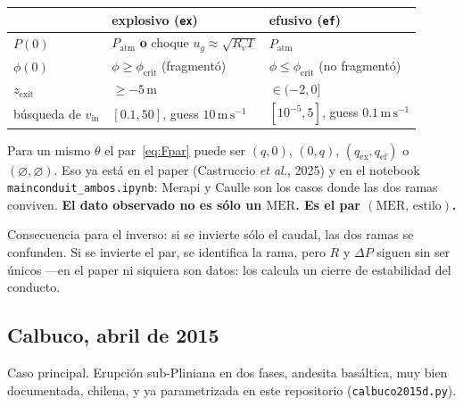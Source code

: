 \documentclass[11pt,a4paper]{article}
\theoremstyle{plain}
\theoremstyle{definition}
\theoremstyle{remark}
\newcommand{\MER}{\mathrm{MER}}
\newcommand{\Rv}{R_v}
\begin{document}
\begin{center}
\small
\begin{tabular}{@{}lll@{}}
\toprule
 & explosivo (\texttt{ex}) & efusivo (\texttt{ef}) \\
\midrule
$P(0)$ & $P_{\mathrm{atm}}$ \textbf{o} choque $u_g\approx\sqrt{\Rv T}$
  & $P_{\mathrm{atm}}$ \\
$\phi(0)$ & $\phi\ge\phi_{\mathrm{crit}}$ (fragmentó)
  & $\phi\le\phi_{\mathrm{crit}}$ (no fragmentó) \\
$z_{\mathrm{exit}}$ & $\ge -5\,\mathrm{m}$ & $\in(-2,0]$ \\
búsqueda de $v_{\mathrm{in}}$ & $[0.1,50]$, guess $10\,\mathrm{m\,s^{-1}}$
  & $[10^{-5},5]$, guess $0.1\,\mathrm{m\,s^{-1}}$ \\
\bottomrule
\end{tabular}
\end{center}

\vspace{0.3em}
Para un mismo $\theta$ el par~\eqref{eq:Fpar} puede ser
$(q,0)$, $(0,q)$, $(q_{\mathrm{ex}},q_{\mathrm{ef}})$ o
$(\varnothing,\varnothing)$. Eso ya está en el paper
(Castruccio \emph{et al.}, 2025) y en el notebook
\texttt{mainconduit\_ambos.ipynb}: Merapi y Caulle son los casos
donde las dos ramas conviven. \textbf{El dato observado no es
sólo un $\MER$. Es el par $(\MER,\,\mathrm{estilo})$.}

Consecuencia para el inverso: si se invierte sólo el caudal, las
dos ramas se confunden. Si se invierte el par, se identifica la
rama, pero $R$ y $\Delta P$ siguen sin ser únicos ---en el paper
ni siquiera son datos: los calcula un cierre de estabilidad del
conducto.

\subsection{Calbuco, abril de 2015}

Caso principal. Erupción sub-Pliniana en dos fases, andesita
basáltica, muy bien documentada, chilena, y ya parametrizada en
este repositorio (\texttt{calbuco2015d.py}).
\end{document}
